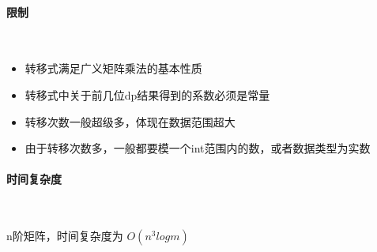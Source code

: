 \paragraph{限制}~{}
\par

\begin{itemize}
    \item 转移式满足广义矩阵乘法的基本性质
    \item 转移式中关于前几位dp结果得到的系数必须是常量
    \item 转移次数一般超级多，体现在数据范围超大
    \item 由于转移次数多，一般都要模一个int范围内的数，或者数据类型为实数
\end{itemize}

\paragraph{时间复杂度}~{}
\par
n阶矩阵，时间复杂度为 $O(n^{3}logm)$